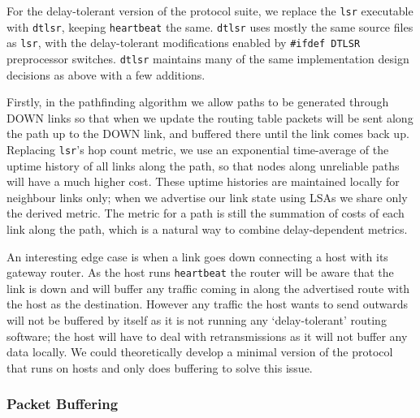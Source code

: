 \documentclass[10pt,twoside,a4paper]{article}
\begin{document}
For the delay-tolerant version of the protocol suite, we replace the \texttt{lsr} executable with \texttt{dtlsr}, keeping \texttt{heartbeat} the same. \texttt{dtlsr} uses mostly the same source files as \texttt{lsr}, with the delay-tolerant modifications enabled by \texttt{\#ifdef DTLSR} preprocessor switches. \texttt{dtlsr} maintains many of the same implementation design decisions as above with a few additions.

Firstly, in the pathfinding algorithm we allow paths to be generated through DOWN links so that when we update the routing table packets will be sent along the path up to the DOWN link, and buffered there until the link comes back up. Replacing \texttt{lsr}'s hop count metric, we use an exponential time-average of the uptime history of all links along the path, so that nodes along unreliable paths will have a much higher cost. These uptime histories are maintained locally for neighbour links only; when we advertise our link state using LSAs we share only the derived metric. The metric for a path is still the summation of costs of each link along the path, which is a natural way to combine delay-dependent metrics.

An interesting edge case is when a link goes down connecting a host with its gateway router. As the host runs \texttt{heartbeat} the router will be aware that the link is down and will buffer any traffic coming in along the advertised route with the host as the destination. However any traffic the host wants to send outwards will not be buffered by itself as it is not running any `delay-tolerant' routing software; the host will have to deal with retransmissions as it will not buffer any data locally.  We could theoretically develop a minimal version of the protocol that runs on hosts and only does buffering to solve this issue.

\subsubsection{Packet Buffering}
\end{document}
